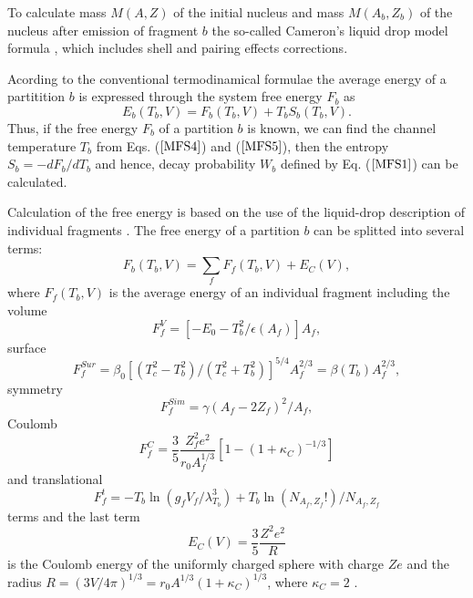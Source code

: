 To calculate mass $M(A,Z)$ of the initial nucleus and mass $M(A_b,Z_b)$
of the nucleus after emission of fragment $b$ the so-called Cameron's
liquid drop model formula \cite{CAM57},
 which includes shell and pairing effects corrections.
 
Acording to the conventional termodinamical formulae the average energy
of a partitition $b$ is expressed through the system free energy $F_b$
as
\begin{equation}
\label{MFS5}E_b(T_b, V)= F_b(T_b,V) +T_bS_b(T_b,V).
\end{equation} 
Thus, if the free energy $F_b$ of a partition $b$ is known, we can find
the channel temperature $T_b$ from Eqs. ($\ref{MFS4}$) and ($\ref{MFS5}$),
then the entropy $S_b = -dF_b/dT_b$ and hence, decay probability $W_b$
defined by Eq. ($\ref{MFS1}$) can be calculated.

Calculation of the free energy is based on the use of the liquid-drop
description of individual fragments \cite{Botvina87}.  The free energy
of a partition $b$ can be splitted into several terms:
\begin{equation}
\label{MFS6}F_b(T_b,V) =  \sum_{f}F_f(T_b,V) + E_{C}(V), 
\end{equation}
where $F_f(T_b,V)$ is the average energy of an individual fragment
including the volume
\begin{equation} 
\label{MFS7} F^V_f = [-E_0 - T^2_b/\epsilon(A_f)]A_f, 
\end{equation}
surface 
\begin{equation}
\label{MFS8}F^{Sur}_f = \beta_0[(T_c^2 - T^2_b)/(T_c^2 + T^2_b)]^{5/4}A_f^{2/3}
= \beta(T_b)A_f^{2/3},
\end{equation}
symmetry 
\begin{equation}
\label{MFS9}F^{Sim}_f = \gamma(A_f - 2Z_f)^2/A_f, 
\end{equation}
Coulomb 
\begin{equation}
\label{MFS10}F^{C}_f = \frac{3}{5}\frac{Z_f^2e^2}{r_0A_f^{1/3}}
[1 - (1+ \kappa_{C})^{-1/3}]
\end{equation}
and translational 
\begin{equation}
\label{MFS11}F^{t}_f = -T_b\ln{(g_fV_f/\lambda^3_{T_b})} + 
T_b\ln{(N_{A_f,Z_f}!)}/ N_{A_f,Z_f}
\end{equation}
terms  and the last term
\begin{equation}
\label{MFS12} E_{C}(V)=\frac{3}{5}\frac{Z^2e^2}{R} 
\end{equation}  
is the Coulomb energy of the uniformly charged sphere with charge $Ze$
and the radius $R = (3V/4\pi)^{1/3}= r_0A^{1/3}(1 + \kappa_{C})^{1/3}$,
where $\kappa_{C} = 2$ \cite{Botvina87}.

